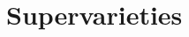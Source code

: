 \documentclass[a4paper,10pt]{scrreprt}
\newcommand{\R}{\mathbb{R}}
\theoremstyle{definition}
\newtheorem{definition}{Definition}[section]
\theoremstyle{plain}
\newtheorem{theorem}{Theorem}[section]
\theoremstyle{remark}
\newtheorem{note}{Note}[section]
\begin{document}
\section{Supervarieties} \label{sec:supervarieties}
%
%
%
%
\end{document}
